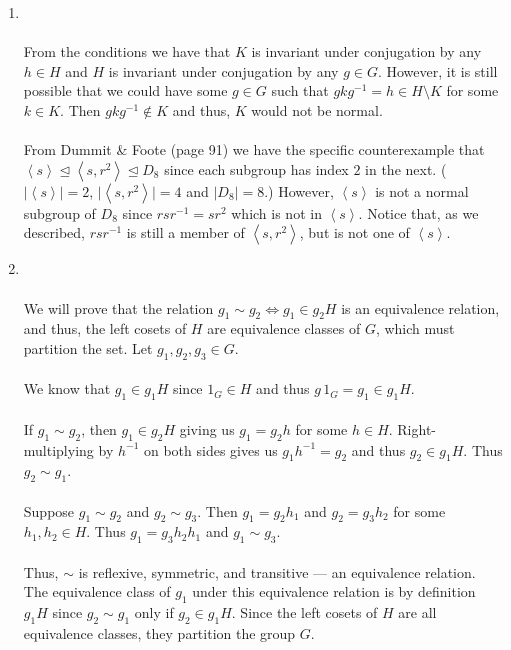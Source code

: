 \documentclass[12 pt, letterpaper]{hmcpset}
\begin{document}
\begin{solution}
	\begin{enumerate}
		\item {} \\\\
			From the conditions we have that $K$ is invariant under conjugation by any $h \in H$ and $H$ is invariant under conjugation by any $g \in G$. However, it is still possible that we could have some $g \in G$ such that $gkg^{-1} = h \in H \setminus K$ for some $k \in K$. Then $gkg^{-1} \notin K$ and thus, $K$ would not be normal. \\\\
			From Dummit \& Foote (page 91) we have the specific counterexample that $\left < s \right > \trianglelefteq \left < s, r^{2} \right > \trianglelefteq D_{8}$ since each subgroup has index $2$ in the next. ($\lvert \left < s \right > \rvert = 2$, $\lvert \left < s, r^{2} \right > \rvert = 4$ and $\lvert D_{8} \rvert = 8$.) However, $\left < s \right >$ is not a normal subgroup of $D_{8}$ since $rsr^{-1} = sr^{2}$ which is not in $\left < s \right >$. Notice that, as we described, $rsr^{-1}$ is still a member of $\left < s, r^{2} \right >$, but is not one of $\left < s \right >$.
		\item {} \\\\
			We will prove that the relation $g_{1} \sim g_2 \iff g_{1} \in g_{2}H$ is an equivalence relation, and thus, the left cosets of $H$ are equivalence classes of $G$, which must partition the set. Let $g_{1}, g_{2}, g_3 \in G$. \\\\
			We know that $g_{1} \in g_{1} H$ since $1_{G} \in H$ and thus $g \, 1_{G} = g_1 \in g_{1}H$. \\\\
			If $g_{1} \sim g_2$, then $g_{1} \in g_{2} H$ giving us $g_{1} = g_{2} h$ for some $h \in H$. Right-multiplying by $h^{-1}$ on both sides gives us $g_{1} h^{-1} = g_{2}$ and thus $g_{2} \in g_{1} H$. Thus $g_{2} \sim g_{1}$. \\\\
			Suppose $g_{1} \sim g_{2}$ and $g_{2} \sim g_{3}$. Then $g_{1} = g_{2} h_{1}$ and $g_{2} = g_{3} h_{2}$ for some $h_{1}, h_{2} \in H$. Thus $g_{1} = g_{3} h_{2} h_{1}$ and $g_{1} \sim g_{3}$. \\\\
			Thus, $\sim$ is reflexive, symmetric, and transitive --- an equivalence relation. The equivalence class of $g_{1}$ under this equivalence relation is by definition $g_{1}H$ since $g_{2} \sim g_{1}$ only if $g_{2} \in g_{1} H$. Since the left cosets of $H$ are all equivalence classes, they partition the group $G$.

\end{enumerate}
\end{solution}
\end{document}
